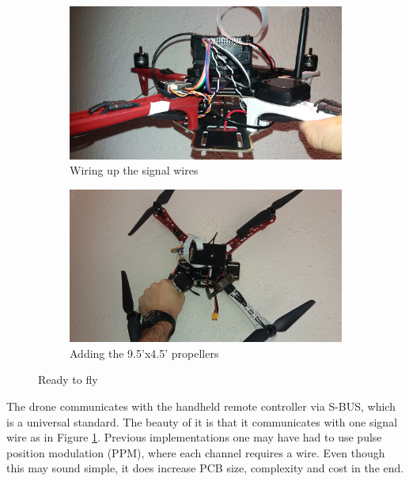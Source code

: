 \begin{figure}[H]
\begin{subfigure}{0.5\textwidth}
\centering
\includegraphics[scale=0.1]{images/drone-build-signal-wires.jpg}
\caption{Wiring up the signal wires}
\label{fig:attach_sbus}
\end{subfigure}
\begin{subfigure}{0.5\textwidth}
\centering
\includegraphics[scale=0.1]{images/drone-build-props.jpg}
\caption{Adding the 9.5'x4.5' propellers}
\label{fig:attach_props}
\end{subfigure}
\caption{Ready to fly}
\label{fig:attach_signal_props}
\end{figure}

The drone communicates with the handheld remote controller via S-BUS, which is a universal standard. The beauty of it is that it communicates with one signal wire as in Figure \ref{fig:attach_sbus}. Previous implementations one may have had to use pulse position modulation (PPM), where each channel requires a wire. Even though this may sound simple, it does increase PCB size, complexity and cost in the end.\\

